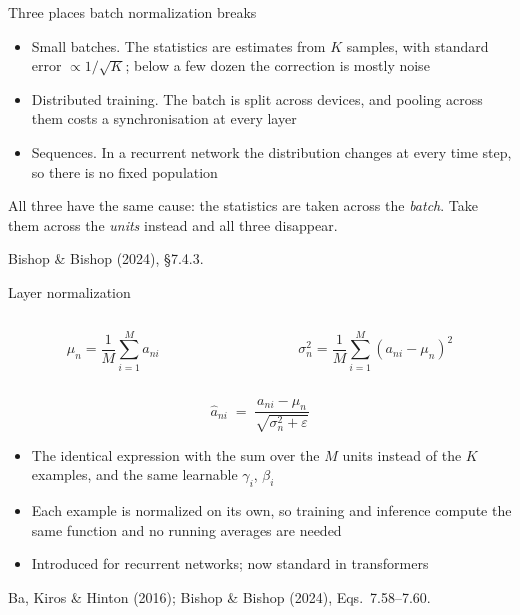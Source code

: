 \documentclass[aspectratio=169, 11pt]{beamer}
\newcommand{\srcline}[1]{%
  \par\vspace{0.25em}%
  {\scriptsize\color{mcMuted}\hfill #1\par}}
\newcommand{\src}[3]{}      %
\begin{document}
\begin{frame}{Three places batch normalization breaks}
  \src{bishop2024}{section}{7.4.3}
  \vspace{0.25em}
  \begin{itemize}\itemsep0.38em
    \item \alert{Small batches.} The statistics are estimates from $K$
          samples, with standard error $\propto 1/\sqrt{K}$; below a few
          dozen the correction is mostly noise
    \item \alert{Distributed training.} The batch is split across
          devices, and pooling across them costs a synchronisation at
          every layer
    \item \alert{Sequences.} In a recurrent network the distribution
          changes at every time step, so there is no fixed population
  \end{itemize}
  \vspace{0.4em}
  \begin{redhighlight}
    All three have the same cause: the statistics are taken across the
    \emph{batch}. Take them across the \emph{units} instead and all
    three disappear.
  \end{redhighlight}
  \srcline{Bishop \& Bishop (2024), \S7.4.3.}
\end{frame}

\begin{frame}{Layer normalization}
  \src{bishop2024}{equation}{7.58-7.60}
  \src{bishop2024}{section}{7.4.3}
  \src{ba2016}{equation}{3}
  \src{ba2016}{section}{3}
  \vspace{-0.55em}
  \begin{columns}[T, onlytextwidth]
    \begin{column}{0.47\textwidth}
      \[ \mu_n = \frac{1}{M}\sum_{i=1}^{M} a_{ni} \]
    \end{column}
    \begin{column}{0.50\textwidth}
      \[ \sigma_n^2 = \frac{1}{M}\sum_{i=1}^{M}(a_{ni} - \mu_n)^2 \]
    \end{column}
  \end{columns}
  \vspace{-0.6em}
  \[
    \hat{a}_{ni} \;=\; \frac{a_{ni} - \mu_n}{\sqrt{\sigma_n^2 +
      \varepsilon}}
  \]
  \vspace{-0.7em}
  \begin{itemize}\itemsep0.28em
    \item The identical expression with the sum over the $M$
          \alert{units} instead of the $K$ examples, and the same
          learnable $\gamma_i$, $\beta_i$
    \item Each example is normalized on its own, so training and
          inference compute the \alert{same} function and no running
          averages are needed
    \item Introduced for recurrent networks; now standard in
          transformers
  \end{itemize}
  \srcline{Ba, Kiros \& Hinton (2016); Bishop \& Bishop (2024),
  Eqs.~7.58--7.60.}
\end{frame}
\end{document}

